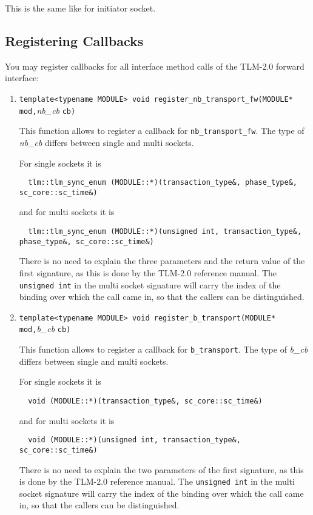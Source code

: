 \documentclass[a4paper,10pt]{article}          %
\begin{document}
This is the same like for initiator socket.

\subsection{Registering Callbacks}
You may register callbacks for all interface method calls of the TLM-2.0 forward interface:

\begin{enumerate}
\item 
\verb|template<typename MODULE> void register_nb_transport_fw(MODULE* mod,|\emph{nb\_cb} \verb|cb)|

This function allows to register a callback for \verb|nb_transport_fw|. The type of \emph{nb\_cb} differs between single and multi sockets.

For single sockets it is 

\verb|  tlm::tlm_sync_enum (MODULE::*)(transaction_type&, phase_type&, sc_core::sc_time&)|

and for multi sockets it is

\verb|  tlm::tlm_sync_enum (MODULE::*)(unsigned int, transaction_type&, phase_type&, sc_core::sc_time&)|

There is no need to explain the three parameters and the return value of the first signature, as this is done by the TLM-2.0 reference manual. The \verb|unsigned int| in the multi socket signature will carry the index of the binding over which the call came in, so that the callers can be distinguished.

\item 
\verb|template<typename MODULE> void register_b_transport(MODULE* mod,|\emph{b\_cb} \verb|cb)|

This function allows to register a callback for \verb|b_transport|. The type of \emph{b\_cb} differs between single and multi sockets.

For single sockets it is 

\verb|  void (MODULE::*)(transaction_type&, sc_core::sc_time&)|

and for multi sockets it is

\verb|  void (MODULE::*)(unsigned int, transaction_type&, sc_core::sc_time&)|

There is no need to explain the two parameters of the first signature, as this is done by the TLM-2.0 reference manual. The \verb|unsigned int| in the multi socket signature will carry the index of the binding over which the call came in, so that the callers can be distinguished.


\end{enumerate}
\end{document}
